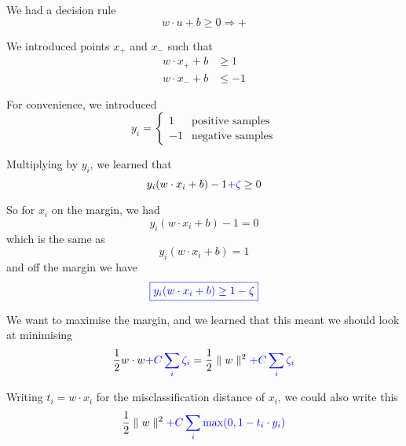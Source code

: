
We had a decision rule
\begin{displaymath}
  \boxed{w\cdot u + b \ge 0 \Rightarrow +}
\end{displaymath}

We introduced points $x_+$ and $x_-$ such that
\begin{align*}
  w\cdot x_+ + b & \ge 1
  \\
  w\cdot x_- + b & \le -1
\end{align*}

For convenience, we introduced
\begin{equation*}
  y_i =
  \begin{cases}
    1 & \mbox{positive samples} \\
    -1 & \mbox{negative samples}
  \end{cases}
\end{equation*}

Multiplying by $y_i$, we learned that
\begin{displaymath}
  y_i(w\cdot x_i + b) - 1 \textcolor{blue}{+ \zeta} \ge 0
\end{displaymath}

So for $x_i$ on the margin, we had
\begin{displaymath}
  \boxed{y_i(w\cdot x_i + b) - 1 = 0}
\end{displaymath}
which is the same as
\begin{displaymath}
  \boxed{y_i(w\cdot x_i + b) = 1}
\end{displaymath}
and off the margin we have
\begin{displaymath}
  \textcolor{blue}{\boxed{y_i(w\cdot x_i + b) \ge 1-\zeta}}
\end{displaymath}

We want to maximise the margin, and we learned that this meant we
should look at minimising
\begin{displaymath}
  \frac 12 w\cdot w \textcolor{blue}{+ C\sum_i \zeta_i}
  = \frac 12 \parallel w \parallel^2 \textcolor{blue}{+ C\sum_i \zeta_i}
\end{displaymath}

Writing $t_i = w\cdot x_i$ for the misclassification distance of $x_i$, we could also write this
\begin{displaymath}
  \frac 12 \parallel w \parallel^2 \textcolor{blue}{+ C\sum_i \max(0, 1-t_i\cdot y_i)}
\end{displaymath}


